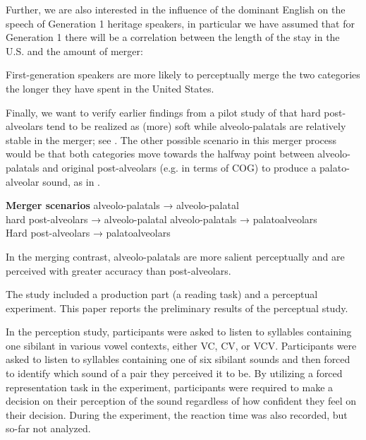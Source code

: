 \documentclass[output=paper,
modfonts,
newtxmath,
hidelinks,
]{langscibook}
\begin{document}
Further, we are also interested in the influence of the dominant English on the speech of Generation 1 heritage speakers, in particular we have assumed that for Generation 1 there will be a correlation between the length of the stay in the U.S. and the amount of merger:


\begin{exe}
  First-generation speakers are more likely to perceptually merge   the two categories the longer they have spent in the United   States.
\end{exe}


Finally, we want to verify earlier findings from a pilot study of \citet{Cavar-etal2016} that hard post-alveolars tend to be realized as (more) soft while alveolo-palatals are relatively stable in the merger; see . The other possible scenario in this merger process would be that both categories move towards the halfway point between alveolo-palatals and original post-alveolars (e.g. in terms of COG) to produce a palato-alveolar sound, as in .

\ea\textbf{Merger scenarios}
   \ea\label{ex:mihajlovic:1a}
alveolo-palatals      → alveolo-palatal\\
        hard post-alveolars → alveolo-palatal
\ex\label{ex:mihajlovic:1b}  alveolo-palatals       → palatoalveolars\\
        Hard post-alveolars → palatoalveolars
\z
\z

\begin{exe}
  In the merging contrast, alveolo-palatals are more salient perceptually and are perceived with greater accuracy than post-alveolars.
\end{exe}

The study included a production part (a reading task) and a perceptual experiment. This paper reports the preliminary results of the perceptual study.

In the perception study, participants were asked to listen to syllables containing one sibilant in various vowel contexts, either VC, CV, or VCV. Participants were asked to listen to syllables containing one of six sibilant sounds and then forced to identify which sound of a pair they perceived it to be. By utilizing a forced representation task in the experiment, participants were required to make a decision on their perception of the sound regardless of how confident they feel on their decision. During the experiment, the reaction time was also recorded, but so-far not analyzed.
\end{document}
